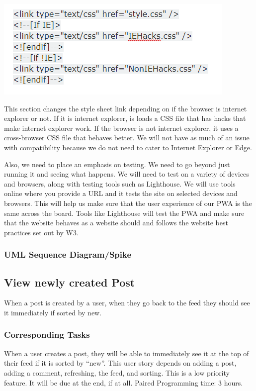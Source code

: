 \documentclass[12pt]{article}
\begin{document}
\includegraphics[scale=0.5]{img/ConditionalStyleSheet.png}\linebreak

This section changes the style sheet link depending on if the browser is internet explorer or not.  If it is internet explorer, is loads a CSS file that has hacks that make internet explorer work.  If the browser is not internet explorer, it uses a cross-browser CSS file that behaves better.  We will not have as much of an issue with compatibility because we do not need to cater to Internet Explorer or Edge.

Also, we need to place an emphasis on testing.  We need to go beyond just running it and seeing what happens.  We will need to test on a variety of devices and browsers, along with testing tools such as Lighthouse.  We will use tools online where you provide a URL and it tests the site on selected devices and browsers.  This will help us make sure that the user experience of our PWA is the same across the board.  Tools like Lighthouse will test the PWA and make sure that the website behaves as a website should and follows the website best practices set out by W3.

\subsubsection{UML Sequence Diagram/Spike}

\subsection{View newly created Post}
When a post is created by a user, when they go back to the feed they should see
it immediately if sorted by new.
\subsubsection{Corresponding Tasks}
	When a user creates a post, they will be able to immediately see it at the top of their feed if it is sorted by “new”.  This user story depends on adding a post, adding a comment, refreshing, the feed, and sorting.  This is a low priority feature.  It will be due at the end, if at all.  Paired Programming time: 3 hours.
\end{document}

